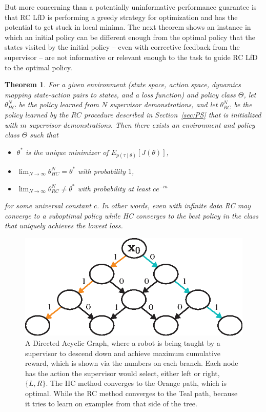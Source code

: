 \documentclass[10pt, conference]{ieeeconf}      %
\newtheorem{theorem}{Theorem}[section]
\begin{document}
But more concerning than a potentially uninformative performance guarantee is that RC LfD is performing a greedy strategy for optimization and has the potential to get stuck in local minima.
The next theorem shows an instance in which an initial policy can be different enough from the optimal policy that the states visited by the initial policy -- even with corrective feedback from the supervisor --  are not informative or relevant enough to the task to guide RC LfD to the optimal policy. 

\begin{theorem}
For a given environment (state space, action space, dynamics mapping state-action pairs to states, and a loss function) and policy class $\Theta$,
let $\theta_{HC}^N$ be the policy learned from $N$ supervisor demonstrations,
and let $\theta_{RC}^N$ be the policy learned by the $RC$ procedure described in Section~\ref{sec:PS} that is initialized with $m$ supervisor demonstrations.  
Then there exists an environment and policy class $\Theta$ such that 
\begin{itemize}
\item $\theta^*$ is the unique minimizer of $E_{p(\tau \mid \theta)}[ J( \theta ) ]$,
\item $\lim_{N \rightarrow \infty} \theta_{HC}^N = \theta^*$ with probability $1$,
\item $\lim_{N \rightarrow \infty} \theta_{RC}^N \neq \theta^*$ with probability at least $c e^{-m}$
\end{itemize}
for some universal constant $c$.
In other words, even with infinite data RC may converge to a suboptimal policy while HC converges to the best policy in the class that uniquely achieves the lowest loss.
\end{theorem}

\begin{figure}
\centering
\includegraphics{f_figs/counter_exmp.eps}
\caption{
    \footnotesize
A Directed Acyclic Graph, where a robot is being taught by a supervisor to descend down and achieve maximum cumulative reward, which is shown via the numbers on each branch. Each node has the action the supervisor would select, either left or right, $\lbrace L, R \rbrace$. The HC method converges to the Orange path, which is optimal. While the RC method converges to the Teal path, because it tries to learn on examples from that side of the tree.}
\vspace*{-20pt}
\label{fig:c_ex}
\end{figure}
\end{document}
